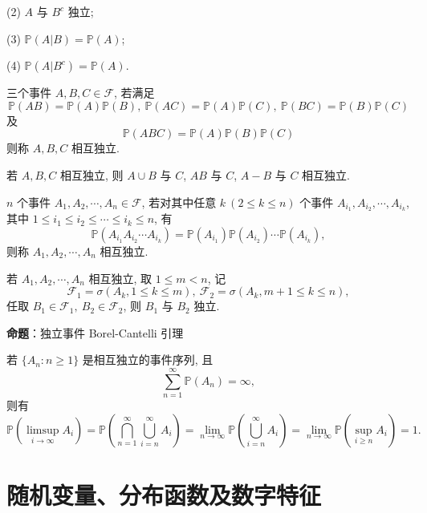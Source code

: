 \documentclass[openany]{ctexbook}
\theoremstyle{kaiti}
\theoremstyle{normal}
\begin{document}
(2) $A$ 与 $B^c$ 独立;

(3) $\mathbb{P}(A|B)=\mathbb{P}(A)$;

(4) $\mathbb{P}(A|B^c)=\mathbb{P}(A)$.

三个事件 $A,B,C\in\mathcal{F}$, 若满足
\begin{equation}
  \mathbb{P}(AB)=\mathbb{P}(A)\mathbb{P}(B),~\mathbb{P}(AC)=\mathbb{P}(A)\mathbb{P}(C),~\mathbb{P}(BC)=\mathbb{P}(B)\mathbb{P}(C)
\end{equation}
及
\begin{equation}
  \mathbb{P}(ABC)=\mathbb{P}(A)\mathbb{P}(B)\mathbb{P}(C)
\end{equation}
则称 $A,B,C$ 相互独立. 

若 $A,B,C$ 相互独立, 则 $A\cup B$ 与 $C$, $AB$ 与 $C$, $A-B$ 与 $C$ 相互独立.

$n$ 个事件 $A_1,A_2,\cdots,A_n\in\mathcal{F}$, 若对其中任意 $k~(2\leqslant k\leqslant n)$ 个事件 $A_{i_1},A_{i_2},\cdots,A_{i_k}$, 其中 $1\leqslant i_1\leqslant i_2\leqslant\cdots\leqslant i_k\leqslant n$, 有
\begin{equation}
  \mathbb{P}(A_{i_1}A_{i_2}\cdots A_{i_k})=\mathbb{P}(A_{i_1})\mathbb{P}(A_{i_2})\cdots \mathbb{P}(A_{i_k}),
\end{equation}
则称 $A_1,A_2,\cdots,A_n$ 相互独立. 

若 $A_1,A_2,\cdots,A_n$ 相互独立, 取 $1\leqslant m<n$, 记
\begin{equation}
  \mathcal{F}_1=\sigma(A_k,1\leqslant k\leqslant m),~\mathcal{F}_2=\sigma(A_k,m+1\leqslant k\leqslant n),
\end{equation}
任取 $B_1\in\mathcal{F}_1,~B_2\in\mathcal{F}_2$, 则 $B_1$ 与 $B_2$ 独立.

\textbf{命题}：独立事件 Borel-Cantelli 引理

若 $\{A_n:n\geqslant1\}$ 是相互独立的事件序列, 且
\begin{equation}
  \sum_{n=1}^\infty \mathbb{P}(A_n)=\infty,
\end{equation}
则有
\begin{equation}
  \mathbb{P}\left(\limsup_{i\to\infty}A_i\right)=\mathbb{P}\left(\bigcap_{n=1}^\infty\bigcup_{i=n}^\infty A_i\right)=\lim_{n\to\infty}\mathbb{P}\left(\bigcup_{i=n}^\infty A_i\right)=\lim_{n\to\infty}\mathbb{P}\left(\sup_{i\geqslant n} A_i\right)=1.
\end{equation}

\section{随机变量、分布函数及数字特征}
\end{document}
